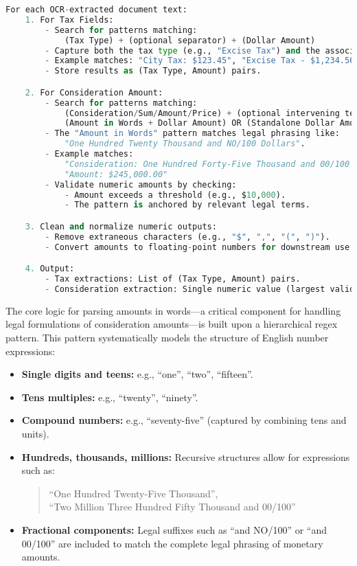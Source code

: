 \documentclass{article}
\begin{document}
\begin{lstlisting}[language=Python, caption={High-level Pseudocode for Tax and Consideration Extraction}]
For each OCR-extracted document text:
    1. For Tax Fields:
        - Search for patterns matching:
            (Tax Type) + (optional separator) + (Dollar Amount)
        - Capture both the tax type (e.g., "Excise Tax") and the associated dollar amount.
        - Example matches: "City Tax: $123.45", "Excise Tax - $1,234.56".
        - Store results as (Tax Type, Amount) pairs.

    2. For Consideration Amount:
        - Search for patterns matching:
            (Consideration/Sum/Amount/Price) + (optional intervening text) + 
            (Amount in Words + Dollar Amount) OR (Standalone Dollar Amount)
        - The "Amount in Words" pattern matches legal phrasing like:
            "One Hundred Twenty Thousand and NO/100 Dollars".
        - Example matches: 
            "Consideration: One Hundred Forty-Five Thousand and 00/100 Dollars ($145,000.00)"
            "Amount: $245,000.00"
        - Validate numeric amounts by checking:
            - Amount exceeds a threshold (e.g., $10,000).
            - The pattern is anchored by relevant legal terms.

    3. Clean and normalize numeric outputs:
        - Remove extraneous characters (e.g., "$", ",", "(", ")").
        - Convert amounts to floating-point numbers for downstream use.

    4. Output:
        - Tax extractions: List of (Tax Type, Amount) pairs.
        - Consideration extraction: Single numeric value (largest valid match).
\end{lstlisting}

The core logic for parsing amounts in words---a critical component for handling legal formulations of consideration amounts---is built upon a hierarchical regex pattern. This pattern systematically models the structure of English number expressions:

\begin{itemize}
    \item \textbf{Single digits and teens:} e.g., ``one'', ``two'', ``fifteen''.
    \item \textbf{Tens multiples:} e.g., ``twenty'', ``ninety''.
    \item \textbf{Compound numbers:} e.g., ``seventy-five'' (captured by combining tens and units).
    \item \textbf{Hundreds, thousands, millions:} Recursive structures allow for expressions such as:
    \begin{quote}
        ``One Hundred Twenty-Five Thousand'', \\
        ``Two Million Three Hundred Fifty Thousand and 00/100''
    \end{quote}
    \item \textbf{Fractional components:} Legal suffixes such as ``and NO/100'' or ``and 00/100'' are included to match the complete legal phrasing of monetary amounts.
\end{itemize}
\end{document}
